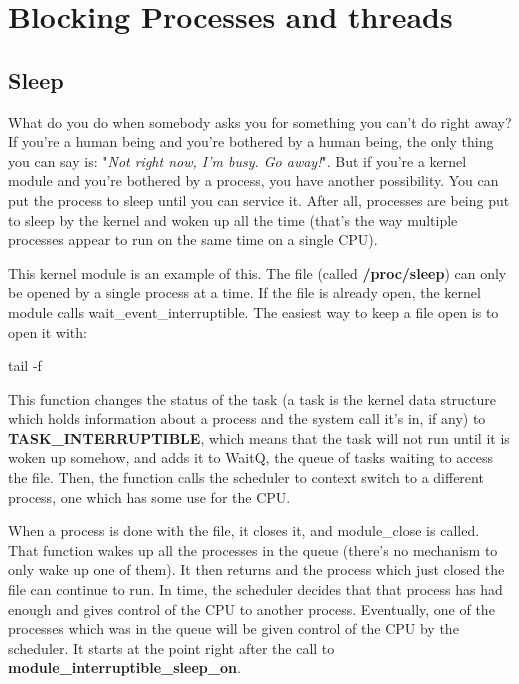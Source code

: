 \documentclass[10pt, oneside]{book}
\begin{document}

\section{Blocking Processes and threads}
\label{sec:org864c195}
\subsection{Sleep}
\label{sec:org4869971}
What do you do when somebody asks you for something you can't do right away? If you're a human being and you're bothered by a human being, the only thing you can say is: "\emph{Not right now, I'm busy. Go away!}". But if you're a kernel module and you're bothered by a process, you have another possibility. You can put the process to sleep until you can service it. After all, processes are being put to sleep by the kernel and woken up all the time (that's the way multiple processes appear to run on the same time on a single CPU).

This kernel module is an example of this. The file (called \textbf{/proc/sleep}) can only be opened by a single process at a time. If the file is already open, the kernel module calls wait\_event\_interruptible. The easiest way to keep a file open is to open it with:

\begin{codebash}
tail -f
\end{codebash}

This function changes the status of the task (a task is the kernel data structure which holds information about a process and the system call it's in, if any) to \textbf{TASK\_INTERRUPTIBLE}, which means that the task will not run until it is woken up somehow, and adds it to WaitQ, the queue of tasks waiting to access the file. Then, the function calls the scheduler to context switch to a different process, one which has some use for the CPU.

When a process is done with the file, it closes it, and module\_close is called. That function wakes up all the processes in the queue (there's no mechanism to only wake up one of them). It then returns and the process which just closed the file can continue to run. In time, the scheduler decides that that process has had enough and gives control of the CPU to another process. Eventually, one of the processes which was in the queue will be given control of the CPU by the scheduler. It starts at the point right after the call to \textbf{module\_interruptible\_sleep\_on}.
\end{document}
